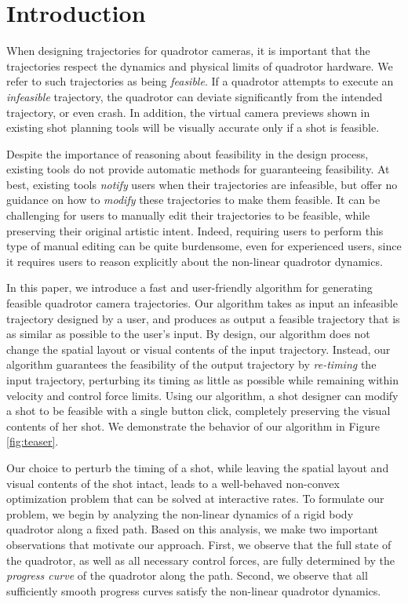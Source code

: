 \section{Introduction}

When designing trajectories for quadrotor cameras, it is important that the  trajectories respect the dynamics and physical limits of quadrotor hardware.
We refer to such trajectories as being \emph{feasible}.
If a quadrotor attempts to execute an \emph{infeasible}  trajectory, 
the quadrotor can deviate significantly from the intended trajectory, or even crash.
In addition, the virtual camera previews shown in existing shot planning tools will be visually accurate only if a shot is feasible.

Despite the importance of reasoning about feasibility in the design process, existing tools do not provide automatic methods for guaranteeing feasibility.
At best, existing tools \emph{notify} users when their trajectories are infeasible, but offer no guidance on how to \emph{modify} these trajectories to make them feasible.
It can be challenging for users to manually edit their trajectories to be feasible,  while preserving their original artistic intent. Indeed, requiring users to perform this type of manual editing can be quite burdensome, even for experienced users, since it requires users to reason explicitly about the non-linear quadrotor dynamics.

In this paper, we introduce a fast and user-friendly algorithm for generating feasible quadrotor camera trajectories.
Our algorithm takes as input an infeasible trajectory designed by a user, and produces as output a feasible trajectory that is as similar as possible to the user's input.
By design, our algorithm does not change the spatial layout or  visual contents of the input trajectory.
Instead, our algorithm guarantees the feasibility of the output trajectory by \emph{re-timing} the input trajectory, perturbing its timing as little as possible while remaining within velocity and control force limits.
Using our algorithm, a shot designer can modify a shot to be feasible with a single button click, completely preserving the visual contents of her shot.
We demonstrate the behavior of our algorithm in Figure \ref{fig:teaser}.

Our choice to perturb the timing of a shot, while leaving the spatial layout and visual contents of the shot intact, leads to a well-behaved non-convex optimization problem that can be solved at interactive rates.
To formulate our problem, we begin by analyzing the non-linear dynamics of a rigid body quadrotor along a fixed path.
Based on this analysis, we make two important observations that motivate our approach.
First, we observe that the full state of the quadrotor, as well as all necessary control forces, are fully determined by the \emph{progress curve} of the quadrotor along the path.
Second, we observe that all sufficiently smooth progress curves satisfy the non-linear quadrotor dynamics.

